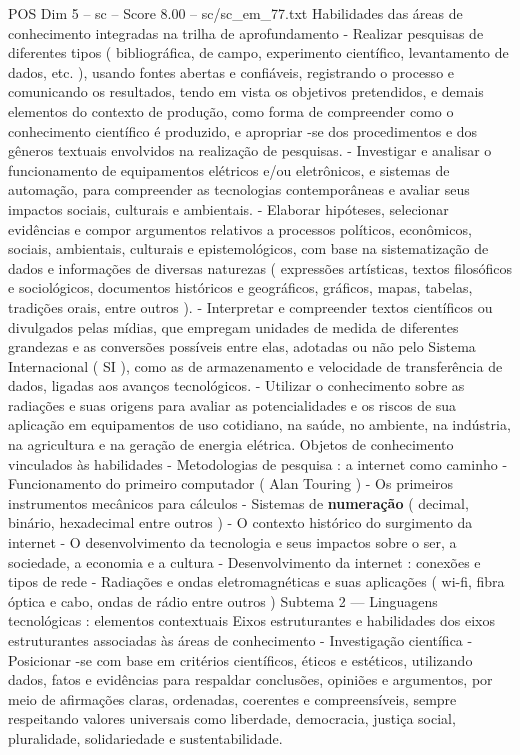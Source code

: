 \begin{textsample}{POS Dim 5 – sc – Score 8.00 – sc/sc\_em\_77.txt}
Habilidades das áreas de conhecimento integradas na trilha de aprofundamento - Realizar pesquisas de diferentes tipos ( bibliográfica, de campo, experimento científico, levantamento de dados, etc. ), usando fontes abertas e confiáveis, registrando o processo e comunicando os resultados, tendo em vista os objetivos pretendidos, e demais elementos do contexto de produção, como forma de compreender como o conhecimento científico é produzido, e apropriar -se dos procedimentos e dos gêneros textuais envolvidos na realização de pesquisas. - Investigar e analisar o funcionamento de equipamentos elétricos e/ou eletrônicos, e sistemas de automação, para compreender as tecnologias contemporâneas e avaliar seus impactos sociais, culturais e ambientais. - Elaborar hipóteses, selecionar evidências e compor argumentos relativos a processos políticos, econômicos, sociais, ambientais, culturais e epistemológicos, com base na sistematização de dados e informações de diversas naturezas ( expressões artísticas, textos filosóficos e sociológicos, documentos históricos e geográficos, gráficos, mapas, tabelas, tradições orais, entre outros ). - Interpretar e compreender textos científicos ou divulgados pelas mídias, que empregam unidades de medida de diferentes grandezas e as conversões possíveis entre elas, adotadas ou não pelo Sistema Internacional ( SI ), como as de armazenamento e velocidade de transferência de dados, ligadas aos avanços tecnológicos. - Utilizar o conhecimento sobre as radiações e suas origens para avaliar as potencialidades e os riscos de sua aplicação em equipamentos de uso cotidiano, na saúde, no ambiente, na indústria, na agricultura e na geração de energia elétrica.
Objetos de conhecimento vinculados às habilidades - Metodologias de pesquisa : a internet como caminho - Funcionamento do primeiro computador ( Alan Touring ) - Os primeiros instrumentos mecânicos para cálculos - Sistemas de \textbf{numeração} ( decimal, binário, hexadecimal entre outros ) - O contexto histórico do surgimento da internet - O desenvolvimento da tecnologia e seus impactos sobre o ser, a sociedade, a economia e a cultura - Desenvolvimento da internet : conexões e tipos de rede - Radiações e ondas eletromagnéticas e suas aplicações ( wi-fi, fibra óptica e cabo, ondas de rádio entre outros ) Subtema 2 — Linguagens tecnológicas : elementos contextuais Eixos estruturantes e habilidades dos eixos estruturantes associadas às áreas de conhecimento - Investigação científica - Posicionar -se com base em critérios científicos, éticos e estéticos, utilizando dados, fatos e evidências para respaldar conclusões, opiniões e argumentos, por meio de afirmações claras, ordenadas, coerentes e compreensíveis, sempre respeitando valores universais como liberdade, democracia, justiça social, pluralidade, solidariedade e sustentabilidade.

\end{textsample}
